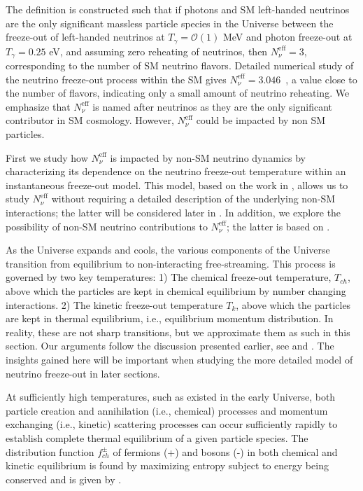 The definition  is constructed such that if photons and SM left-handed neutrinos are the only significant massless particle species in the Universe between the freeze-out of left-handed neutrinos at $T_\gamma=\mathcal{O}(1)$ MeV and photon freeze-out at $T_\gamma=0.25$ eV, and assuming zero reheating of neutrinos, then $N^{\text{eff}}_{\nu}=3$, corresponding to the number of SM neutrino flavors. Detailed numerical study of the neutrino freeze-out process within the SM gives $N^{\text{eff}}_{\nu}=3.046$~\cite{Mangano:2005cc}, a value close to the number of flavors, indicating only a small amount of neutrino reheating. 
 We emphasize that $N^{\text{eff}}_\nu$ is named after neutrinos as they are the only significant contributor in SM cosmology. However, $N^{\text{eff}}_\nu$ could be impacted by non SM particles.

First we study how $N^{\text{eff}}_{\nu}$ is impacted by non-SM neutrino dynamics by characterizing its dependence on the neutrino freeze-out temperature within an instantaneous freeze-out model. This model, based on the work in \cite{Birrell:2013gpa,Birrell:2012gg}, allows us to study $N^{\text{eff}}_{\nu}$ without requiring a detailed description of the underlying non-SM interactions; the latter will be considered later in . In addition, we explore the possibility of non-SM neutrino contributions to $N^{\text{eff}}_\nu$; the latter is based on \cite{Birrell:2014cja}.


As the Universe expands and cools, the various components of the Universe transition from equilibrium to non-interacting free-streaming. This process is governed by two key temperatures: 1) The chemical freeze-out temperature, $T_{ch}$, above which the particles are kept in chemical equilibrium by number changing interactions. 2) The kinetic freeze-out temperature $T_k$, above which the particles are kept in thermal equilibrium, i.e., equilibrium momentum distribution. In reality, these are not sharp transitions, but we approximate them as such in this section. Our arguments follow the discussion presented earlier, see  and . The insights gained here will be important when studying the more detailed model of neutrino freeze-out in later sections.

At sufficiently high temperatures, such as existed in the early Universe, both particle creation and annihilation (i.e., chemical) processes and momentum exchanging (i.e., kinetic) scattering processes can occur sufficiently rapidly to establish complete thermal equilibrium of a given particle species. The distribution function $f_{ch}^\pm$ of fermions (+) and bosons (-) in both chemical and kinetic equilibrium is found by maximizing entropy subject to energy being conserved and is given by .
 
